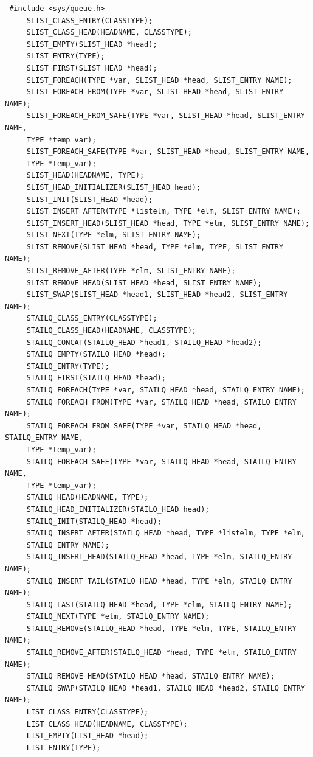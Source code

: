 \documentclass[journal,10pt,onecolumn,compsoc,letterpaper,draftclsnofoot,table,xcdraw]{IEEEtran} \usepackage[margin=0.75in]{geometry}
\begin{document}
\begin{verbatim}
 #include <sys/queue.h>
     SLIST_CLASS_ENTRY(CLASSTYPE);
     SLIST_CLASS_HEAD(HEADNAME,	CLASSTYPE);
     SLIST_EMPTY(SLIST_HEAD *head);
     SLIST_ENTRY(TYPE);
     SLIST_FIRST(SLIST_HEAD *head);
     SLIST_FOREACH(TYPE	*var, SLIST_HEAD *head,	SLIST_ENTRY NAME);
     SLIST_FOREACH_FROM(TYPE *var, SLIST_HEAD *head, SLIST_ENTRY NAME);
     SLIST_FOREACH_FROM_SAFE(TYPE *var,	SLIST_HEAD *head, SLIST_ENTRY NAME,
	 TYPE *temp_var);
     SLIST_FOREACH_SAFE(TYPE *var, SLIST_HEAD *head, SLIST_ENTRY NAME,
	 TYPE *temp_var);
     SLIST_HEAD(HEADNAME, TYPE);
     SLIST_HEAD_INITIALIZER(SLIST_HEAD head);
     SLIST_INIT(SLIST_HEAD *head);
     SLIST_INSERT_AFTER(TYPE *listelm, TYPE *elm, SLIST_ENTRY NAME);
     SLIST_INSERT_HEAD(SLIST_HEAD *head, TYPE *elm, SLIST_ENTRY	NAME);
     SLIST_NEXT(TYPE *elm, SLIST_ENTRY NAME);
     SLIST_REMOVE(SLIST_HEAD *head, TYPE *elm, TYPE, SLIST_ENTRY NAME);
     SLIST_REMOVE_AFTER(TYPE *elm, SLIST_ENTRY NAME);
     SLIST_REMOVE_HEAD(SLIST_HEAD *head, SLIST_ENTRY NAME);
     SLIST_SWAP(SLIST_HEAD *head1, SLIST_HEAD *head2, SLIST_ENTRY NAME);
     STAILQ_CLASS_ENTRY(CLASSTYPE);
     STAILQ_CLASS_HEAD(HEADNAME, CLASSTYPE);
     STAILQ_CONCAT(STAILQ_HEAD *head1, STAILQ_HEAD *head2);
     STAILQ_EMPTY(STAILQ_HEAD *head);
     STAILQ_ENTRY(TYPE);
     STAILQ_FIRST(STAILQ_HEAD *head);
     STAILQ_FOREACH(TYPE *var, STAILQ_HEAD *head, STAILQ_ENTRY NAME);
     STAILQ_FOREACH_FROM(TYPE *var, STAILQ_HEAD	*head, STAILQ_ENTRY NAME);
     STAILQ_FOREACH_FROM_SAFE(TYPE *var, STAILQ_HEAD *head, STAILQ_ENTRY NAME,
	 TYPE *temp_var);
     STAILQ_FOREACH_SAFE(TYPE *var, STAILQ_HEAD	*head, STAILQ_ENTRY NAME,
	 TYPE *temp_var);
     STAILQ_HEAD(HEADNAME, TYPE);
     STAILQ_HEAD_INITIALIZER(STAILQ_HEAD head);
     STAILQ_INIT(STAILQ_HEAD *head);
     STAILQ_INSERT_AFTER(STAILQ_HEAD *head, TYPE *listelm, TYPE	*elm,
	 STAILQ_ENTRY NAME);
     STAILQ_INSERT_HEAD(STAILQ_HEAD *head, TYPE	*elm, STAILQ_ENTRY NAME);
     STAILQ_INSERT_TAIL(STAILQ_HEAD *head, TYPE	*elm, STAILQ_ENTRY NAME);
     STAILQ_LAST(STAILQ_HEAD *head, TYPE *elm, STAILQ_ENTRY NAME);
     STAILQ_NEXT(TYPE *elm, STAILQ_ENTRY NAME);
     STAILQ_REMOVE(STAILQ_HEAD *head, TYPE *elm, TYPE, STAILQ_ENTRY NAME);
     STAILQ_REMOVE_AFTER(STAILQ_HEAD *head, TYPE *elm, STAILQ_ENTRY NAME);
     STAILQ_REMOVE_HEAD(STAILQ_HEAD *head, STAILQ_ENTRY	NAME);
     STAILQ_SWAP(STAILQ_HEAD *head1, STAILQ_HEAD *head2, STAILQ_ENTRY NAME);
     LIST_CLASS_ENTRY(CLASSTYPE);
     LIST_CLASS_HEAD(HEADNAME, CLASSTYPE);
     LIST_EMPTY(LIST_HEAD *head);
     LIST_ENTRY(TYPE);

\end{verbatim}
\end{document}
